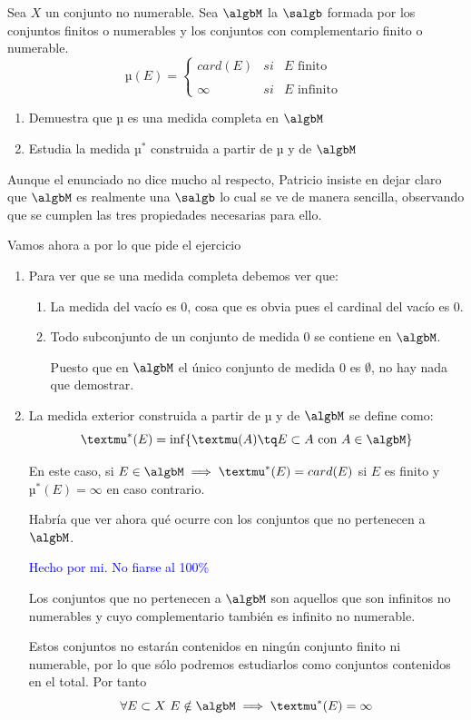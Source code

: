 \begin{problem}[15]
Sea $X$ un conjunto no numerable. Sea $\algbM$ la $\salgb$ formada por los conjuntos finitos o numerables y los conjuntos con complementario finito o numerable.
\[µ(E)= \left\{ \begin{array}{lcc}
             card(E) &   si  & E \text{ finito } \\
            \\ \infty &  si  & E \text{ infinito }
             \end{array}
   \right.\]
\begin{enumerate}
\item Demuestra que µ es una medida completa en $\algbM$
\item Estudia la medida $µ^*$ construida a partir de µ y de $\algbM$
\end{enumerate}

\solution
Aunque el enunciado no dice mucho al respecto, Patricio insiste en dejar claro que  $\algbM$ es realmente una $\salgb$ lo cual se ve de manera sencilla, observando que se cumplen las tres propiedades necesarias para ello.

Vamos ahora a por lo que pide el ejercicio
\begin{enumerate}
\item Para ver que se una medida completa debemos ver que:
\begin{enumerate}
\item La medida del vacío es 0, cosa que es obvia pues el cardinal del vacío es 0.

\item Todo subconjunto de un conjunto de medida 0 se contiene en $\algbM$.

Puesto que en $\algbM$ el único conjunto de medida 0 es $\emptyset$, no hay nada que demostrar.
\end{enumerate}
\item La medida exterior construida a partir de µ y de $\algbM$ se define como:
\[µ ^*(E)=\inf\{µ(A) \tq E \subset A \text { con } A \in \algbM\}\]

En este caso, si $E\in\algbM \implies µ^*(E)=card(E)$ si $E$ es finito y $µ^*(E)=\infty$ en caso contrario.

Habría que ver ahora qué ocurre con los conjuntos que no pertenecen a  $\algbM$.

\textcolor{blue}{Hecho por mi. No fiarse al 100\%}

Los conjuntos que no pertenecen a $\algbM$ son aquellos que son infinitos no numerables y cuyo complementario también es infinito no numerable.

Estos conjuntos no estarán contenidos en ningún conjunto finito ni numerable, por lo que sólo podremos estudiarlos como conjuntos contenidos en el total. Por tanto
\[\forall E \subset X \ E \notin \algbM \implies µ^*(E)=\infty\]
\end{enumerate}
\end{problem}

